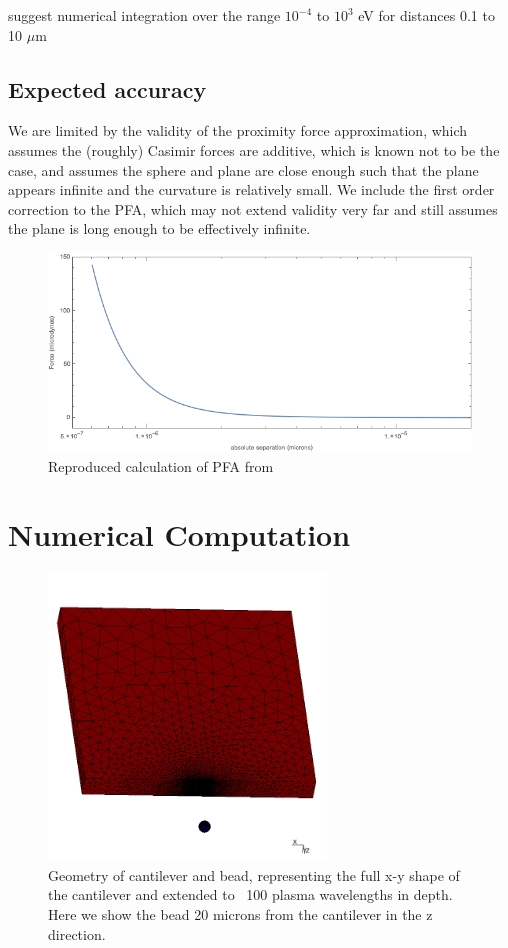 \documentclass[11pt,traditabstract]{article}
\begin{document}
\citet{Lambrecht} suggest numerical integration over the range $10^{-4}$ to $10^{3}$ eV for distances 0.1 to 10 $\mu$m

\subsection{Expected accuracy}
We are limited by the validity of the proximity force approximation, which assumes the (roughly) Casimir forces are additive, which is known not to be the case, and assumes the sphere and plane are close enough such that the plane appears infinite and the curvature is relatively small. We include the first order correction to the PFA, which may not extend validity very far and still assumes the plane is long enough to be effectively infinite.

\begin{figure}[h]
\centering
\includegraphics[width=5in]{LamPFA}
\caption{Reproduced calculation of PFA from \citet{Lamoreaux}}\label{fig:LamPFA}
\end{figure}

\section{Numerical Computation}

\begin{figure}[!h]
\centering
\includegraphics[height=3in]{Bead_positions}
\caption{Geometry of cantilever and bead, representing the full x-y shape of the cantilever and extended to ~100 plasma wavelengths in depth. Here we show the bead 20 microns from the cantilever in the z direction.}\label{fig:geoLarge}
\end{figure}
\end{document}
